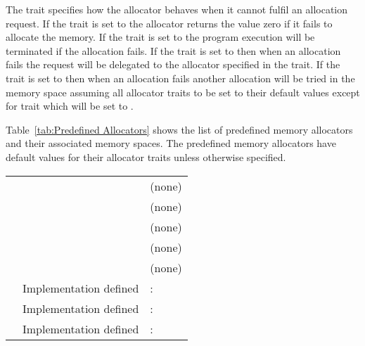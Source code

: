 The  trait specifies how the allocator behaves when it cannot fulfil an allocation request. If the  trait is set to  the allocator returns the value zero if it fails to allocate the memory. If the  trait is set to  the program execution will be terminated if the allocation fails. If the  trait is set to  then when an allocation fails the request will be delegated to the allocator specified in the  trait. If the  trait is set to  then when an allocation fails another allocation will be tried in the  memory space assuming all allocator traits to be set
to their default values except for  trait which will be set to .

Table~\ref{tab:Predefined Allocators} shows the list of predefined memory allocators and their associated memory spaces. The predefined memory allocators have default values for their allocator traits unless otherwise specified.

\nolinenumbers
\renewcommand{\arraystretch}{1.5}
\tablelasttail{\hline}
\begin{supertabular}{p{1.8in}p{2in}p{1.2in}}
{} & {} & (none)\\
{} & {} & (none)\\
{} & {}& (none)\\
{} & {} & (none)\\
{} & {} & (none)\\
{} & Implementation defined & {}:{}\\
{} & Implementation defined & {}:{}\\
{} & Implementation defined & {}:{}\\
\end{supertabular}
\linenumbers

